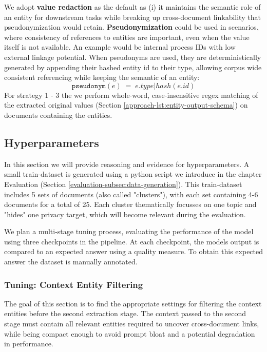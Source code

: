 We adopt \textbf{value redaction} as the default as (i) it maintains the semantic role of an entity for downstream tasks while breaking up cross-document linkability that pseudonymization would retain. \textbf{Pseudonymization} could be used in scenarios, where consistency of references to entities are important, even when the value itself is not available. An example would be internal process IDs with low external linkage potential. When pseudonyms are used, they are deterministically generated by appending their hashed entity id to their type, allowing corpus wide consistent referencing while keeping the semantic of an entity: 
\[
    \texttt{pseudonym}(e) \;=\; e.type \vert hash(e.id)
\]
For strategy 1 - 3 the we perform whole-word, case-insensitive regex matching of the extracted original values (Section \ref{approach-lst:entity-output-schema}) on documents containing the entities.

 
\subsection{Hyperparameters} \label{approach-subsec:hyperparams}
In this section we will provide reasoning and evidence for hyperparameters. A small train-dataset is generated using a python script we introduce in the chapter Evaluation (Section \ref{evaluation-subsec:data-generation}). This train-dataset includes 5 sets of documents (also called "clusters"), with each set containing 4-6 documents for a total of 25. Each cluster thematically focusses on one topic and "hides" one privacy target, which will become relevant during the evaluation.

We plan a multi-stage tuning process, evaluating the performance of the model using three checkpoints in the pipeline. At each checkpoint, the models output is compared to an expected answer using a quality measure. To obtain this expected answer the dataset is manually annotated.

\subsubsection{Tuning: Context Entity Filtering}\label{approach-subsubsec:entity_filter} 
The goal of this section is to find the appropriate settings for filtering the context entities before the second extraction stage. The context passed to the second stage must contain all relevant entities required to uncover cross-document links, while being compact enough to avoid prompt bloat and a potential degradation in performance. 

